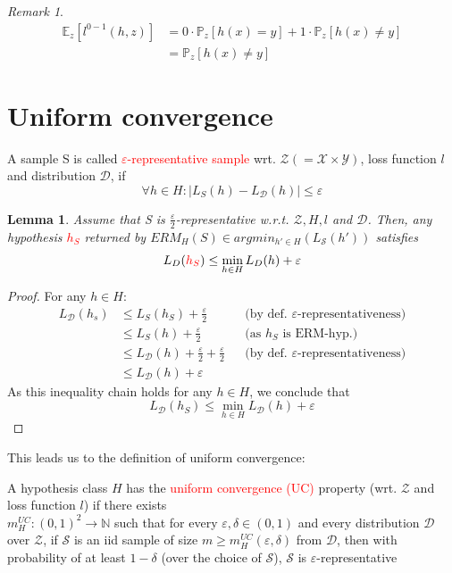 \documentclass[10pt,a4paper]{article}
\newtheorem{lemma}[theorem]{Lemma}
\theoremstyle{remark}
\newtheorem*{remark}{Remark}
\theoremstyle{definition}
\theoremstyle{plain}
\begin{document}
\begin{remark}
	\begin{align*}
		\mathbb{E}_z\left[l^{0-1}(h,z)\right] 
			&= 0 \cdot \mathbb{P}_z[h(x) = y] + 1 \cdot \mathbb{P}_z[h(x) \neq y]\\
			& = \mathbb{P}_z[h(x) \neq y]
	\end{align*}
\end{remark}

\section{Uniform convergence}
\begin{boxeddef}
	A sample S is called \textcolor{red}{$\varepsilon$-representative sample} wrt. $\mathcal{Z} (= \mathcal{X}\times\mathcal{Y})$, loss function $l$ and distribution $\mathcal{D}$, if
	$$
	\forall h \in H: \left|L_S(h) - L_\mathcal{D}(h)\right| \leq \varepsilon
	$$
\end{boxeddef}

\begin{lemma}
	Assume that S is $\frac{\varepsilon}{2}$-representative w.r.t. $\mathcal{Z}, H, l$ and $\mathcal{D}$. Then, any hypothesis \textcolor{red}{$h_S$} returned by $ERM_H(S) \in argmin_{h' \in H}(L_\mathcal{S}(h'))$ satisfies
	$$
	L_D(\text{\textcolor{red}{$h_S$}}) \leq \min_{h \in H} L_D(h) + \varepsilon
	$$
\end{lemma}

\begin{proof}
For any $h \in H$:
\begin{align*}
	L_\mathcal{D}(h_s) 
		&\leq L_S(h_S) + \frac{\varepsilon}{2}  
			&&\text{(by def. $\varepsilon$-representativeness)}\\
		&\leq L_S(h) + \frac{\varepsilon}{2} 
			&&\text{(as $h_S$ is ERM-hyp.)}\\
		&\leq L_\mathcal{D}(h) + \frac{\varepsilon}{2} + \frac{\varepsilon}{2}
			&& \text{(by def. $\varepsilon$-representativeness)}\\
		&\leq  L_\mathcal{D}(h) + \varepsilon
\end{align*}
As this inequality chain holds for any $h \in H$, we conclude that $$L_\mathcal{D}(h_S) \leq \min_{h \in H} L_\mathcal{D}(h) + \varepsilon$$
\end{proof}
This leads us to the definition of uniform convergence:
\begin{boxeddef}
	A hypothesis class $H$ has the \textcolor{red}{uniform convergence (UC)} property (wrt. $\mathcal{Z}$ and loss function $l$) if there exists\\
	 $m_H^{UC}: (0,1)^2 \rightarrow \mathbb{N}$ such that for every $\varepsilon, \delta \in (0,1)$ and every distribution $\mathcal{D}$ over $\mathcal{Z}$, if $\mathcal{S}$ is an iid sample of size $m \geq m_H^{UC}(\varepsilon, \delta)$ from $\mathcal{D}$, then with probability of at least $1-\delta$ (over the choice of $\mathcal{S}$), $\mathcal{S}$ is $\varepsilon$-representative
\end{boxeddef}
\end{document}
